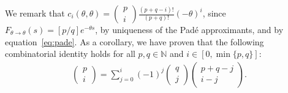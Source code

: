 We remark that $c_i(\theta, \theta) = \begin{pmatrix}p \\ i\end{pmatrix} \frac{(p + q - i)!}{(p + q)!} (-\theta)^i$, since $F_{\theta \rightarrow \theta}(s) = [p/q] e^{-\theta s}$, by uniqueness of the Pad\'e approximants, and by equation~\ref{eq:pade}.
As a corollary, we have proven that the following combinatorial identity holds for all $p, q \in \mathbb{N}$ and $i \in \left[ 0, \min\{p, q\} \right]$:
\begin{align*}
\begin{pmatrix}p \\ i\end{pmatrix} = \sum_{j=0}^i (-1)^j \begin{pmatrix}q \\ j\end{pmatrix} \begin{pmatrix}p + q - j \\ i - j\end{pmatrix} \text{.}
\end{align*}

